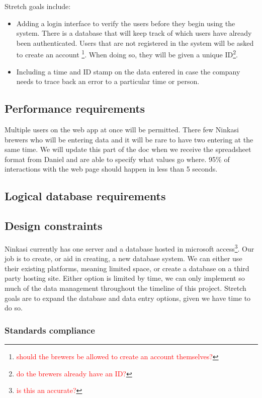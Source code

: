 \documentclass[draftclsnofoot,onecolumn,letterpaper,10pt,compsoc]{IEEEtran}
\newcommand\question[1]{\footnote{\textcolor{red}{#1}}}
\begin{document}
		Stretch goals include:
		\begin{itemize}
			\item{Adding a login interface to verify the users before they begin using the system.
			There is a database that will keep track of which users have already been authenticated.
			Users that are not registered in the system will be asked to create an account \question{should the brewers be allowed to create an account themselves?}.
			When doing so, they will be given a unique ID\question{do the brewers already have an ID?}.}

			\item{Including a time and ID stamp on the data entered in case the company needs to trace back an error to a particular time or person.}
		\end{itemize}

	\subsection{Performance requirements}
		Multiple users on the web app at once will be permitted.
		There few Ninkasi brewers who will be entering data and it will be rare to have two entering at the same time.
		We will update this part of the doc when we receive the spreadsheet format from Daniel and are able to specify what values go where.
		95\% of interactions with the web page should happen in less than 5 seconds.

	\subsection{Logical database requirements}

	\subsection{Design constraints}
		Ninkasi currently has one server and a database hosted in microsoft access\question{is this an accurate?}.
		Our job is to create, or aid in creating, a new database system.
		We can either use their existing platforms, meaning limited space, or create a database on a third party hosting site.
		Either option is limited by time, we can only implement so much of the data management throughout the timeline of this project.
		Stretch goals are to expand the database and data entry options, given we have time to do so.

		\subsubsection{Standards compliance}
\end{document}
